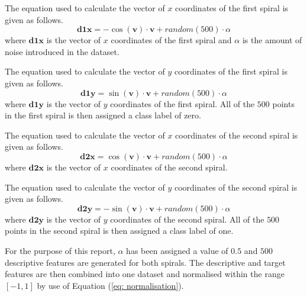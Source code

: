 \documentclass[10pt, conference]{IEEEtran}
\begin{document}
The equation used to calculate the vector of $x$ coordinates of the first spiral is given as follows.
\begin{equation}
    \boldsymbol{d1x} = -\cos(\textbf{v}) \cdot \textbf{v} + random(500) \cdot \alpha \label{eq: d1x}
\end{equation}
where $\boldsymbol{d1x}$ is the vector of $x$ coordinates of the first spiral and $\alpha$
is the amount of noise introduced in the dataset.

The equation used to calculate the vector of $y$ coordinates of the first spiral is given as follows.
\begin{equation}
    \boldsymbol{d1y} = \sin(\textbf{v}) \cdot \textbf{v} + random(500) \cdot \alpha \label{eq: d1y}
\end{equation}
where $\boldsymbol{d1y}$ is the vector of $y$ coordinates of the first spiral.
All of the $500$ points in the first spiral is then assigned a class label of zero.

The equation used to calculate the vector of $x$ coordinates of the second spiral is given as follows.
\begin{equation}
    \boldsymbol{d2x} = \cos(\textbf{v}) \cdot \textbf{v} + random(500) \cdot \alpha \label{eq: d2x}
\end{equation}
where $\boldsymbol{d2x}$ is the vector of $x$ coordinates of the second spiral.

The equation used to calculate the vector of $y$ coordinates of the second spiral is given as follows.
\begin{equation}
    \boldsymbol{d2y} = -\sin(\textbf{v}) \cdot \textbf{v} + random(500) \cdot \alpha \label{eq: d2y}
\end{equation}
where $\boldsymbol{d2y}$ is the vector of $y$ coordinates of the second spiral.
All of the $500$ points in the second spiral is then assigned a class label of one.

For the purpose of this report, $\alpha$ has been assigned a value of $0.5$ and
$500$ descriptive features are generated for both spirals. The descriptive and target
features are then combined into one dataset and normalised within the range $[-1,1]$ by
use of Equation (\ref{eq: normalisation}).
\end{document}
